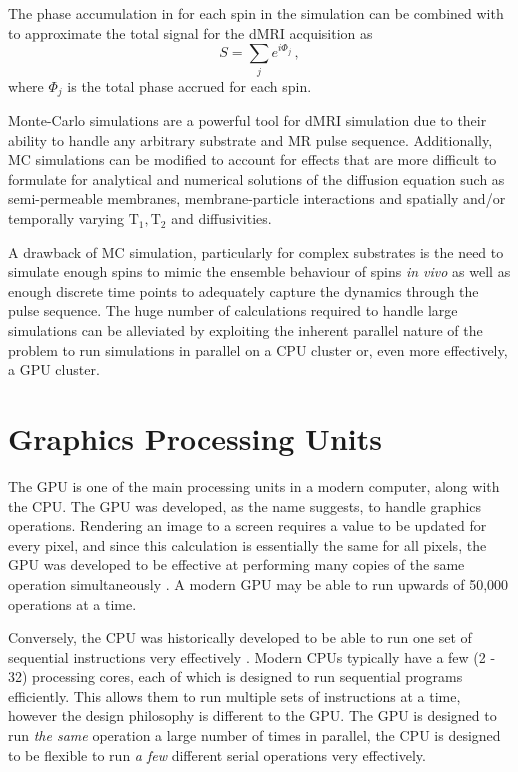 The phase accumulation in  for each spin in the simulation can be combined with  to approximate the total signal for the \ac{dMRI} acquisition as
\begin{equation}
  S = \sum_j e^{i\Phi_j}\,,
  \label{eq:MCsignal}
\end{equation}
where $\Phi_j$ is the total phase accrued for each spin. 

Monte-Carlo simulations are a powerful tool for \ac{dMRI} simulation due to their ability to handle any arbitrary substrate and MR pulse sequence.
Additionally, \ac{MC} simulations can be modified to account for effects that are more difficult to formulate for analytical and numerical solutions of the diffusion equation such as semi-permeable membranes, membrane-particle interactions and spatially and/or temporally varying $\mathrm{T_1, T_2}$ and diffusivities.

A drawback of \ac{MC} simulation, particularly for complex substrates is the need to simulate enough spins to mimic the ensemble behaviour of spins \emph{in vivo} as well as enough discrete time points to adequately capture the dynamics through the pulse sequence.
The huge number of calculations required to handle large simulations can be alleviated by exploiting the inherent parallel nature of the problem to run simulations in parallel on a \ac{CPU} cluster or, even more effectively, a \ac{GPU} cluster.



\section{Graphics Processing Units}
\label{sec:bg_gpu}

The \acf{GPU} is one of the main processing units in a modern computer, along with the \acf{CPU}.
The \ac{GPU} was developed, as the name suggests, to handle graphics operations.
Rendering an image to a screen requires a value to be updated for every pixel, and since this calculation is essentially the same for all pixels, the \ac{GPU} was developed to be effective at performing many copies of the same operation simultaneously \cite{Kirk2013}.
A modern \ac{GPU} may be able to run upwards of 50,000 operations at a time.

Conversely, the \ac{CPU} was historically developed to be able to run one set of sequential instructions very effectively \cite{Kirk2013}. 
Modern \acp{CPU} typically have a few (2 - 32) processing cores, each of which is designed to run sequential programs efficiently.
This allows them to run multiple sets of instructions at a time, however the design philosophy is different to the \ac{GPU}.
The \ac{GPU} is designed to run \emph{the same} operation a large number of times in parallel, the \ac{CPU} is designed to be flexible to run \emph{a few} different serial operations very effectively. 

